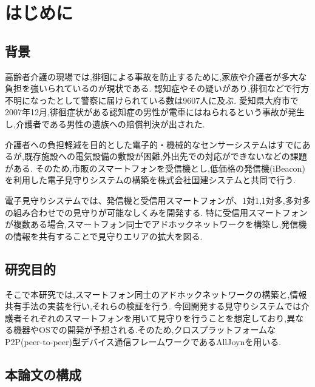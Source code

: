 \chapter{はじめに}
\label{chap:introduction}

\section{背景}
高齢者介護の現場では,徘徊による事故を防止するために,家族や介護者が多大な負担を強いられているのが現状である.
認知症やその疑いがあり,徘徊などで行方不明になったとして警察に届けられている数は9607人に及ぶ.
愛知県大府市で2007年12月,徘徊症状がある認知症の男性が電車にはねられるという事故が発生し,介護者である男性の遺族への賠償判決が出された.

介護者への負担軽減を目的とした電子的・機械的なセンサーシステムはすでにあるが,既存施設への電気設備の敷設が困難,外出先での対応ができないなどの課題がある.
そのため,市販のスマートフォンを受信機とし,低価格の発信機(iBeacon)を利用した電子見守りシステムの構築を株式会社国建システムと共同で行う.

電子見守りシステムでは、発信機と受信用スマートフォンが、1対1,1対多,多対多の組み合わせでの見守りが可能なしくみを開発する.
特に受信用スマートフォンが複数ある場合,スマートフォン同士でアドホックネットワークを構築し,発信機の情報を共有することで見守りエリアの拡大を図る.

\section{研究目的}
そこで本研究では,スマートフォン同士のアドホックネットワークの構築と,情報共有手法の実装を行い,それらの検証を行う.
今回開発する見守りシステムでは介護者それぞれのスマートフォンを用いて見守りを行うことを想定しており,異なる機器やOSでの開発が予想される.そのため,クロスプラットフォームなP2P(peer-to-peer)型デバイス通信フレームワークであるAllJoynを用いる.

\section{本論文の構成}

